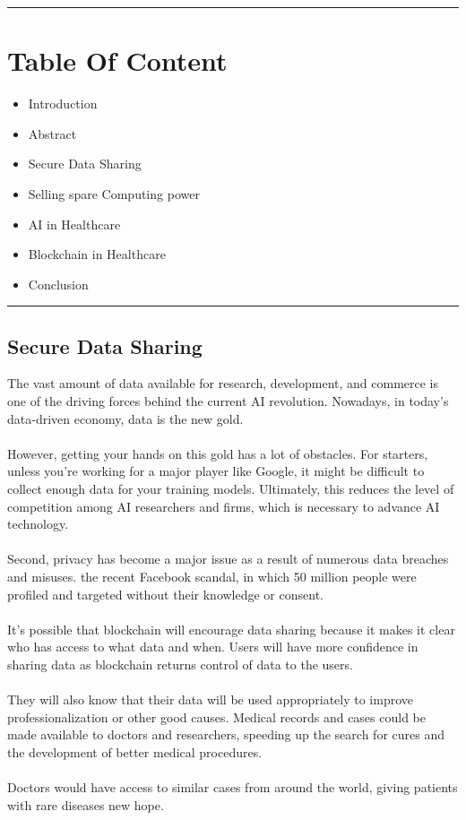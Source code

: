 \documentclass[12pt,letterpaper]{article}
\begin{document}
\pagebreak

  \hrule

  \section* {Table Of Content}
    \begin{itemize}
      \item Introduction
      \item Abstract
      \item Secure Data Sharing
      \item Selling spare Computing power
      \item AI in Healthcare 
      \item Blockchain in Healthcare
      \item Conclusion
    \end{itemize}

    \hrule

\pagebreak

    \subsection* {Secure Data Sharing}
    The vast amount of data available for research, development, and commerce is one of the driving forces behind the current AI revolution. Nowadays, in today's data-driven economy, data is the new gold.
    \\
    \\
    However, getting your hands on this gold has a lot of obstacles. For starters, unless you're working for a major player like Google, it might be difficult to collect enough data for your training models. Ultimately, this reduces the level of competition among AI researchers and firms, which is necessary to advance AI technology. 
    \\
    \\
    Second, privacy has become a major issue as a result of numerous data breaches and misuses. the recent Facebook scandal, in which 50 million people were profiled and targeted without their knowledge or consent.
    \\
    \\
    It's possible that blockchain will encourage data sharing because it makes it clear who has access to what data and when. Users will have more confidence in sharing data as blockchain returns control of data to the users. 
    \\
    \\
    They will also know that their data will be used appropriately to improve professionalization or other good causes. Medical records and cases could be made available to doctors and researchers, speeding up the search for cures and the development of better medical procedures.
    \\
    \\
    Doctors would have access to similar cases from around the world, giving patients with rare diseases new hope.
\end{document}
